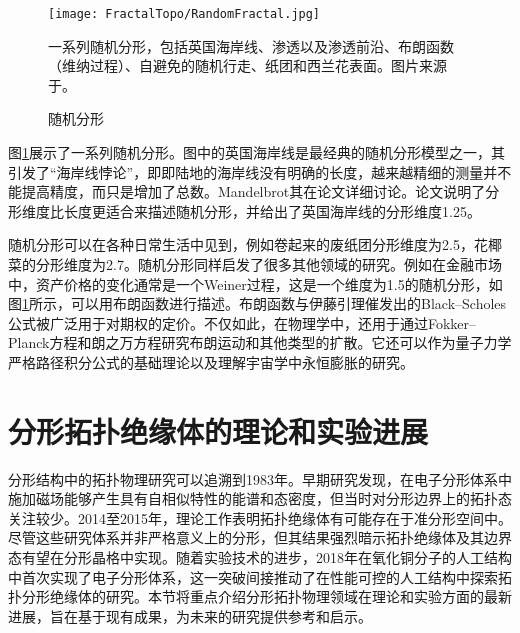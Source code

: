 \begin{figure}[htbp]
    \centering
    \texttt{[image: FractalTopo/RandomFractal.jpg]}
    \caption{随机分形}一系列随机分形，包括英国海岸线、渗透以及渗透前沿、布朗函数（维纳过程）、自避免的随机行走、纸团和西兰花表面。图片来源于\cite{wikipedia_hausdorff_fractals}。
    \label{fig:RandomFractal}
\end{figure}

图\ref{fig:RandomFractal}展示了一系列随机分形。图中的英国海岸线是最经典的随机分形模型之一，其引发了“海岸线悖论”，即即陆地的海岸线没有明确的长度，越来越精细的测量并不能提高精度，而只是增加了总数。Mandelbrot其在论文\cite{mandelbrot1967coast}详细讨论。论文说明了分形维度比长度更适合来描述随机分形，并给出了英国海岸线的分形维度1.25。

随机分形可以在各种日常生活中见到，例如卷起来的废纸团分形维度为2.5，花椰菜的分形维度为2.7。随机分形同样启发了很多其他领域的研究。例如在金融市场中，资产价格的变化通常是一个Weiner过程，这是一个维度为1.5的随机分形，如图\ref{fig:RandomFractal}所示，可以用布朗函数进行描述。布朗函数与伊藤引理\cite{ito1951formula}催发出的Black–Scholes公式被广泛用于对期权的定价\cite{black1973pricing}。不仅如此，在物理学中，还用于通过Fokker–Planck方程\cite{van1992stochastic}和朗之万方程\cite{langevin1908theory}研究布朗运动和其他类型的扩散。它还可以作为量子力学严格路径积分公式的基础理论\cite{kac1949distributions}以及理解宇宙学中永恒膨胀的研究。

\section{分形拓扑绝缘体的理论和实验进展}
分形结构中的拓扑物理研究可以追溯到1983年。早期研究发现，在电子分形体系中施加磁场能够产生具有自相似特性的能谱和态密度\cite{alexander1984some,banavar1985energy}，但当时对分形边界上的拓扑态关注较少。2014至2015年，理论工作表明拓扑绝缘体有可能存在于准分形空间中\cite{song2014topological,he2015topological}。尽管这些研究体系并非严格意义上的分形，但其结果强烈暗示拓扑绝缘体及其边界态有望在分形晶格中实现。随着实验技术的进步，2018年在氧化铜分子的人工结构中首次实现了电子分形体系\cite{kempkes2019design}，这一突破间接推动了在性能可控的人工结构中探索拓扑分形绝缘体的研究。本节将重点介绍分形拓扑物理领域在理论和实验方面的最新进展，旨在基于现有成果，为未来的研究提供参考和启示。
